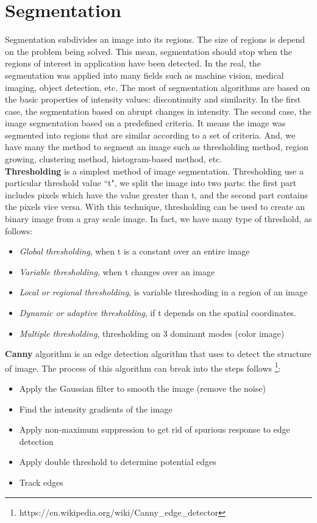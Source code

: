 \section{Segmentation}
Segmentation subdivides an image into its regions. The size of regions is depend on the problem being solved. This mean, segmentation should stop when the regions of interest in application have been detected. In the real, the segmentation was applied into many fields such as machine vision, medical imaging, object detection, etc. The most of segmentation algorithms are based on the basic properties of intensity values: discontinuity and similarity. In the first case, the segmentation based on abrupt changes in intensity. The second case, the image segmentation based on a predefined criteria. It means the image was segmented into regions that are similar according to a set of criteria. And, we have many the method to segment an image such as thresholding method, region growing, clustering method, histogram-based method, etc.\\[0.2 cm]
\textbf{Thresholding} is a simplest method of image segmentation. Thresholding use a particular threshold value ``t", we split the image into two parts: the first part includes pixels which have the value greater than t, and the second part contains the pixels vice versa. With this technique, thresholding can be used to create an binary image from a gray scale image. In fact, we have many type of threshold, as follows:
\begin{itemize}
\item \textit{Global thresholding}, when t is a constant over an entire image
\item \textit{Variable thresholding}, when t changes over an image
\item \textit{Local or regional thresholding}, is variable threshoding in a region of an image
\item \textit{Dynamic or adaptive thresholding}, if t depends on the spatial coordinates.
\item \textit{Multiple thresholding}, thresholding on 3 dominant modes (color image)
\end{itemize}
\textbf{Canny} algorithm is an edge detection algorithm that uses to detect the structure of image. The process of this algorithm can break into the steps follows \footnote{https://en.wikipedia.org/wiki/Canny\_edge\_detector}:
\begin{itemize}
\item Apply the Gaussian filter to smooth the image (remove the noise)
\item Find the intensity gradients of the image
\item Apply non-maximum suppression to get rid of spurious response to edge detection
\item Apply double threshold to determine potential edges
\item Track edges
\end{itemize}
